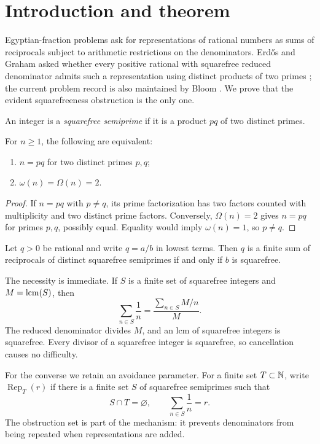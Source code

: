 \section{Introduction and theorem}

Egyptian-fraction problems ask for representations of rational numbers as sums
of reciprocals subject to arithmetic restrictions on the denominators.  Erd\H{o}s
and Graham asked whether every positive rational with squarefree reduced
denominator admits such a representation using distinct products of two primes
\cite{ErdosGraham1980}; the current problem record is also maintained by Bloom
\cite{BloomErdos306}.  We prove that the evident squarefreeness obstruction is
the only one.

An integer is a \emph{squarefree semiprime} if it is a product $pq$ of two
distinct primes.

\begin{lemma}\label{lem:semiprime-equivalence}
For $n\ge1$, the following are equivalent:
\begin{enumerate}[label=(\roman*)]
\item $n=pq$ for two distinct primes $p,q$;
\item $\omega(n)=\Omega(n)=2$.
\end{enumerate}
\end{lemma}
\begin{proof}
If $n=pq$ with $p\ne q$, its prime factorization has two factors counted with
multiplicity and two distinct prime factors.  Conversely, $\Omega(n)=2$ gives
$n=pq$ for primes $p,q$, possibly equal.  Equality would imply $\omega(n)=1$,
so $p\ne q$.
\end{proof}

\begin{theorem}\label{thm:headline}
Let $q>0$ be rational and write $q=a/b$ in lowest terms.  Then $q$ is a finite
sum of reciprocals of distinct squarefree semiprimes if and only if $b$ is
squarefree.
\end{theorem}

The necessity is immediate.  If $S$ is a finite set of squarefree integers and
$M=\operatorname{lcm}(S)$, then
\[
  \sum_{n\in S}\frac1n
  =\frac{\sum_{n\in S}M/n}{M}.
\]
The reduced denominator divides $M$, and an lcm of squarefree integers is
squarefree.  Every divisor of a squarefree integer is squarefree, so cancellation
causes no difficulty.

For the converse we retain an avoidance parameter.  For a finite set
$T\subset\mathbb N$, write $\operatorname{Rep}_T(r)$ if there is a finite set $S$ of
squarefree semiprimes such that
\[
 S\cap T=\varnothing,
 \qquad
 \sum_{n\in S}\frac1n=r.
\]
The obstruction set is part of the mechanism: it prevents denominators from
being repeated when representations are added.

